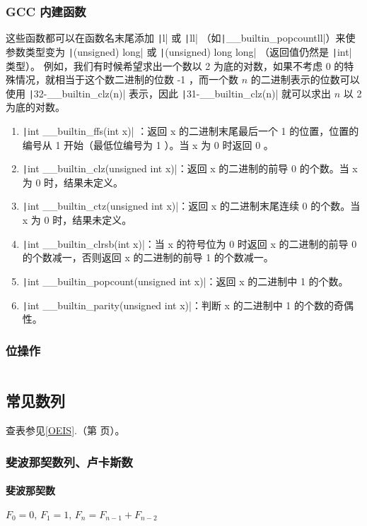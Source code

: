\documentclass[a4paper, twoside]{article}
\newcommand\detailedref[1]{\ref{#1}.\nameref{#1}（第 \pageref{#1} 页）}
\begin{document}
    \subsubsection{GCC 内建函数}
    这些函数都可以在函数名末尾添加 \texttt|l| 或 \texttt|ll| （如\texttt|__builtin_popcountll|）来使参数类型变为 \texttt|(unsigned) long| 或 \texttt|(unsigned) long long| （返回值仍然是 \texttt|int| 类型）。 例如，我们有时候希望求出一个数以 2 为底的对数，如果不考虑 0 的特殊情况，就相当于这个数二进制的位数 -1 ，而一个数 $n$ 的二进制表示的位数可以使用 \texttt|32-__builtin_clz(n)| 表示，因此 \texttt|31-__builtin_clz(n)| 就可以求出 $n$ 以 2 为底的对数。
    \begin{enumerate}
        \item \texttt|int __builtin_ffs(int x)| ：返回 x 的二进制末尾最后一个 1 的位置，位置的编号从 1 开始（最低位编号为 1 ）。当 x 为 0 时返回 0 。
        \item \texttt|int __builtin_clz(unsigned int x)|：返回 x 的二进制的前导 0 的个数。当 x 为 0 时，结果未定义。
        \item \texttt|int __builtin_ctz(unsigned int x)|：返回 x 的二进制末尾连续 0 的个数。当 x 为 0 时，结果未定义。
        \item \texttt|int __builtin_clrsb(int x)|：当 x 的符号位为 0 时返回 x 的二进制的前导 0 的个数减一，否则返回 x 的二进制的前导 1 的个数减一。
        \item \texttt|int __builtin_popcount(unsigned int x)|：返回 x 的二进制中 1 的个数。
        \item \texttt|int __builtin_parity(unsigned int x)|：判断 x 的二进制中 1 的个数的奇偶性。
    \end{enumerate}

    \subsubsection{位操作}
    \inputminted{cpp}{../src/数学/二进制相关.cpp}
    
\subsection{常见数列}
查表参见\detailedref{OEIS}。
    \subsubsection{斐波那契数列、卢卡斯数}
        \paragraph{斐波那契数} $F_0 = 0, \, F_1 = 1, \, F_n = F_{n - 1} + F_{n - 2}$
\end{document}
